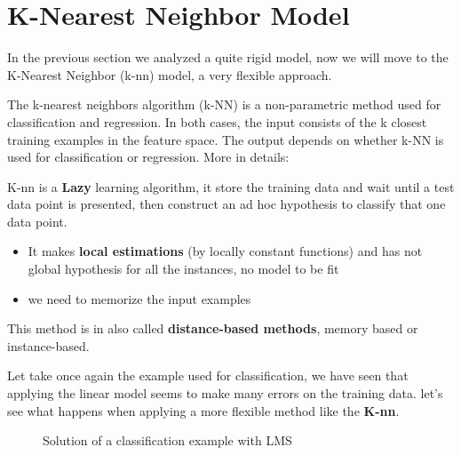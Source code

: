 \documentclass[../main.tex]{subfiles}
\begin{document}
\section{K-Nearest Neighbor Model}
In the previous section we analyzed a quite rigid model, now we will move to the K-Nearest Neighbor (k-nn) model, a very flexible approach.

The k-nearest neighbors algorithm (k-NN) is a non-parametric method used for classification and regression. In both cases, the input consists of the k closest training examples in the feature space. The output depends on whether k-NN is used for classification or regression. More in details:

K-nn is a \textbf{Lazy} learning algorithm, it store the training data and wait until a test data point is presented, then construct an ad hoc hypothesis to classify that one data point.
\begin{itemize}
    \item It makes \textbf{local estimations} (by locally constant functions) and has not global hypothesis for all the instances, no model to be fit
    \item we need to memorize the input examples
\end{itemize} 
This method is in also called \textbf{distance-based methods}, memory based or instance-based.

Let take once again the example used for classification, we have seen that applying the linear model seems to make many errors on the training data. let's see what happens when applying a more flexible method like the \textbf{K-nn}.

\begin{figure}[H]
  \centering
  \hfill
  \caption{Solution of a classification example with LMS}
\end{figure}
\end{document}
